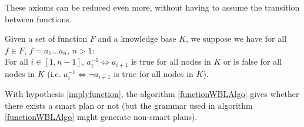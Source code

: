 \documentclass[10pt,a4paper,draft]{article}
\begin{document}
These axioms can be reduced even more, without having to assume the transition between functions.

\begin{hypothesis}
\label{implyfunction}
Given a set of function $F$ and a knowledge base $K$, we suppose we have for all $f \in F$, $f = a_1 ... a_n$, $n > 1$: \\
For all $i \in [1, n-1]$, $a_{i}^{-1} \Leftrightarrow a_{i+1}$ is true for all nodes in $K$ or is false for all nodes in $K$ (i.e. $a_{i}^{-1} \Leftrightarrow \neg a_{i+1}$ is true for all nodes in $K$).\\
\end{hypothesis}

\begin{theorem}
\label{implyaxiomtheorem}
With hypothesis \ref{implyfunction}, the algorithm \ref{functionWBLAlgo} gives whether there exists a smart plan or not (but the grammar used in algorithm \ref{functionWBLAlgo} might generate non-smart plans).
\end{theorem}
\end{document}
